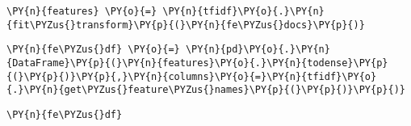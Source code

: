     \begin{tcolorbox}[breakable, size=fbox, boxrule=1pt, pad at break*=1mm,colback=cellbackground, colframe=cellborder]
\begin{Verbatim}[commandchars=\\\{\}]
\PY{n}{features} \PY{o}{=} \PY{n}{tfidf}\PY{o}{.}\PY{n}{fit\PYZus{}transform}\PY{p}{(}\PY{n}{fe\PYZus{}docs}\PY{p}{)}
\end{Verbatim}
\end{tcolorbox}

    \begin{tcolorbox}[breakable, size=fbox, boxrule=1pt, pad at break*=1mm,colback=cellbackground, colframe=cellborder]
\begin{Verbatim}[commandchars=\\\{\}]
\PY{n}{fe\PYZus{}df} \PY{o}{=} \PY{n}{pd}\PY{o}{.}\PY{n}{DataFrame}\PY{p}{(}\PY{n}{features}\PY{o}{.}\PY{n}{todense}\PY{p}{(}\PY{p}{)}\PY{p}{,}\PY{n}{columns}\PY{o}{=}\PY{n}{tfidf}\PY{o}{.}\PY{n}{get\PYZus{}feature\PYZus{}names}\PY{p}{(}\PY{p}{)}\PY{p}{)}
\end{Verbatim}
\end{tcolorbox}

    \begin{tcolorbox}[breakable, size=fbox, boxrule=1pt, pad at break*=1mm,colback=cellbackground, colframe=cellborder]
\begin{Verbatim}[commandchars=\\\{\}]
\PY{n}{fe\PYZus{}df}
\end{Verbatim}
\end{tcolorbox}


